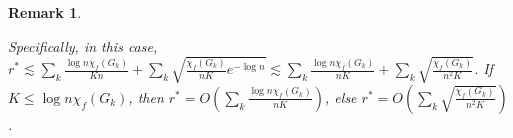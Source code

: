 \documentclass{article}
\newtheorem*{remark}{Remark}
\begin{document}
\begin{remark}
\begin{enumerate}[(1)]
    Specifically, in this case, $r^* \lesssim \sum_k \frac{\log n \chi_f(G_k)}{K n} + \sum_k \sqrt{\frac{\chi_f(G_k)}{n K} e^{-\log n} } \lesssim \sum_k \frac{\log n \chi_f(G_k)}{n K}+ \sum_k \sqrt{\frac{\chi_f(G_k)}{n^2 K}}$. 
    If $K \leq \log n \chi_f(G_k)$, then $r^* =O\left( \sum_k \frac{\log n \chi_f(G_k)}{n K} \right) $, else $r^* = O\left(  \sum_k \sqrt{\frac{\chi_f(G_k)}{n^2 K}}
  \right)$.
    
\end{enumerate}
\end{remark}



\end{document}
